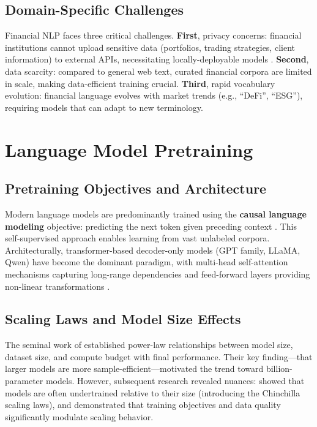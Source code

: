 \subsection{Domain-Specific Challenges}

Financial NLP faces three critical challenges. \textbf{First}, privacy concerns: financial institutions cannot upload sensitive data (portfolios, trading strategies, client information) to external APIs, necessitating locally-deployable models \parencite{wu2023bloomberggpt}. \textbf{Second}, data scarcity: compared to general web text, curated financial corpora are limited in scale, making data-efficient training crucial. \textbf{Third}, rapid vocabulary evolution: financial language evolves with market trends (e.g., ``DeFi'', ``ESG''), requiring models that can adapt to new terminology.

\section{Language Model Pretraining}

\subsection{Pretraining Objectives and Architecture}

Modern language models are predominantly trained using the \textbf{causal language modeling} objective: predicting the next token given preceding context \parencite{radford2019language, brown2020language}. This self-supervised approach enables learning from vast unlabeled corpora. Architecturally, transformer-based decoder-only models (GPT family, LLaMA, Qwen) have become the dominant paradigm, with multi-head self-attention mechanisms capturing long-range dependencies and feed-forward layers providing non-linear transformations \parencite{vaswani2017attention, touvron2023llama}.

\subsection{Scaling Laws and Model Size Effects}

The seminal work of \textcite{kaplan2020scaling} established power-law relationships between model size, dataset size, and compute budget with final performance. Their key finding---that larger models are more sample-efficient---motivated the trend toward billion-parameter models. However, subsequent research revealed nuances: \textcite{hoffmann2022training} showed that models are often undertrained relative to their size (introducing the Chinchilla scaling laws), and \textcite{tay2022ul2} demonstrated that training objectives and data quality significantly modulate scaling behavior.


